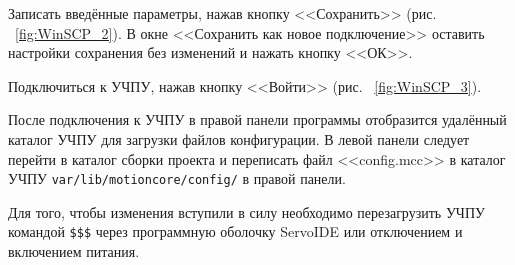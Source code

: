 
Записать введённые параметры, нажав кнопку <<Сохранить>> (рис. ~\ref{fig:WinSCP_2}). В окне <<Сохранить как новое подключение>> оставить настройки сохранения без изменений и нажать кнопку <<ОК>>.


Подключиться к УЧПУ, нажав кнопку <<Войти>> (рис. ~\ref{fig:WinSCP_3}).


После подключения к УЧПУ в правой панели программы отобразится удалённый каталог УЧПУ для загрузки файлов конфигурации. В левой панели следует перейти в каталог сборки проекта и переписать файл <<config.mcc>> в каталог УЧПУ \texttt{var/lib/motioncore/config/} в правой панели.\killoverfullbefore


Для того, чтобы изменения вступили в силу необходимо перезагрузить УЧПУ командой \texttt{\$\$\$} через программную оболочку ServoIDE или отключением и включением питания.\killoverfullbefore


\clearpage